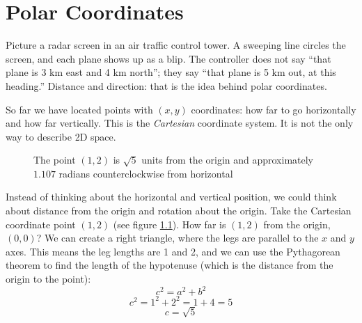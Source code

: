 \chapter{Polar Coordinates}

Picture a radar screen in an air traffic control
tower. A sweeping line circles the screen, and each plane shows up as a
blip. The controller does not say ``that plane is 3 km east and 4 km
north''; they say ``that plane is 5 km out, at this heading.'' Distance and
direction: that is the idea behind polar coordinates.

So far we have located points with $(x,y)$ coordinates: how far to go
horizontally and how far vertically. This is the
\textit{Cartesian} coordinate system.
It is not the only way to describe 2D space.

\begin{figure}[H]
\centering
    \caption{The point $(1, 2)$ is $\sqrt{5}$ units from the origin and 
    approximately $1.107$ radians counterclockwise from horizontal}
    \label{fig:cartesian}
    \end{figure}

Instead of thinking about the horizontal and vertical position, we could think 
about distance from the origin and rotation about the origin. Take the 
Cartesian coordinate point $(1, 2)$ (see figure \ref{fig:cartesian}). How far is 
$(1,2)$ from the origin, $(0,0)$? We can create a right triangle, where the 
legs are parallel to the $x$ and $y$ axes. This means the leg lengths are 1 and 2, 
and we can use the Pythagorean theorem to find the length of the hypotenuse 
(which is the distance from the origin to the point):
$$c^2 = a^2 + b^2$$
$$c^2 = 1^2 + 2^2 = 1 + 4 = 5$$
$$c = \sqrt{5}$$

